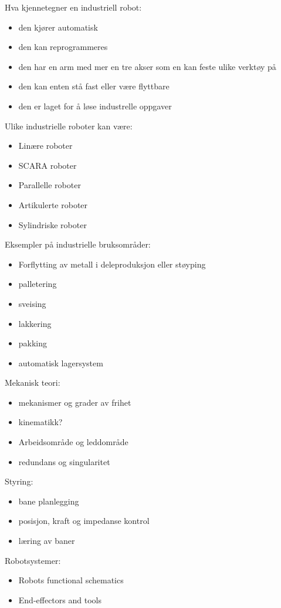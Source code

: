 Hva kjennetegner en industriell robot:
\begin{itemize}%
\item den kjører automatisk
\item den kan reprogrammeres
\item den har en arm med mer en tre akser som en kan feste ulike verktøy på
\item den kan enten stå fast eller være flyttbare
\item den er laget for å løse industrelle oppgaver 
\end{itemize}

Ulike industrielle roboter kan være:
\begin{itemize}%
\item Linære roboter
\item SCARA roboter
\item Parallelle roboter
\item Artikulerte roboter
\item Sylindriske roboter
\end{itemize}

Eksempler på industrielle bruksområder:


\begin{itemize}%
\item Forflytting av metall i deleproduksjon eller støyping
\item palletering
\item sveising
\item lakkering
\item pakking
\item automatisk lagersystem
\end{itemize}



Mekanisk teori:
\begin{itemize}%
\item mekanismer og grader av frihet
\item kinematikk?
\item Arbeidsområde og leddområde
\item redundans og singularitet
\end{itemize}

Styring:
\begin{itemize}%
\item bane planlegging
\item posisjon, kraft og impedanse kontrol
\item læring av baner
\end{itemize}



Robotsystemer:
\begin{itemize}%
\item Robots functional schematics
\item End-effectors and tools
\end{itemize}








